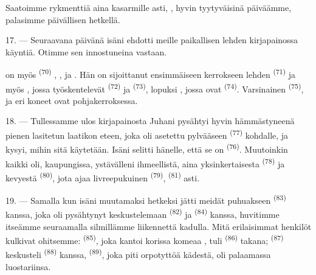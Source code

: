 Saatoimme rykmenttiä aina kasarmille asti, , hyvin tyytyväisinä
päiväämme, palasimme päivällisen hetkellä.

\VUsaut{3.0mm}

17. --- Seuraavana päivänä isäni ehdotti meille paikallisen lehden kirjapainossa
käyntiä. Otimme sen innostuneina vastaan.

 on myös  \textsuperscript{(70)}
, ,  ja
. Hän on sijoittanut ensimmäiseen kerrokseen lehden
 \textsuperscript{(71)} ja myös ,
jossa työskentelevät  \textsuperscript{(72)} ja
 \textsuperscript{(73)}, lopuksi
, jossa ovat  \textsuperscript{(74)}.
Varsinainen  \textsuperscript{(75)},
 ja eri koneet ovat pohjakerroksessa.

\VUsaut{3.0mm}

18. --- Tullessamme ulos kirjapainosta Juhani pysähtyi hyvin hämmästyneenä
pienen lasitetun laatikon eteen, joka oli asetettu pylvääseen
 \textsuperscript{(77)} kohdalle, ja kysyi, mihin sitä
käytetään. Isäni selitti hänelle, että se on 
\textsuperscript{(76)}. Muutoinkin kaikki oli, kaupungissa, ystävälleni
ihmeellistä, aina yksinkertaisesta 
\textsuperscript{(78)} ja kevyestä 
\textsuperscript{(80)}, jota ajaa livreepukuinen 
\textsuperscript{(79)},  \textsuperscript{(81)} asti.

19. --- Samalla kun isäni muutamaksi hetkeksi jätti meidät puhuakseen
 \textsuperscript{(83)} kanssa, joka oli pysähtynyt
keskustelemaan  \textsuperscript{(82)} ja 
\textsuperscript{(84)} kanssa, huvitimme itseämme seuraamalla silmillämme
liikennettä kadulla. Mitä erilaisimmat henkilöt kulkivat ohitsemme:
 \textsuperscript{(85)}, joka kantoi korissa komeaa
, tuli  \textsuperscript{(86)} takana;
 \textsuperscript{(87)} keskusteli 
\textsuperscript{(88)} kanssa,  \textsuperscript{(89)}, joka piti
orpotyttöä kädestä, oli palaamassa luostariinsa.

